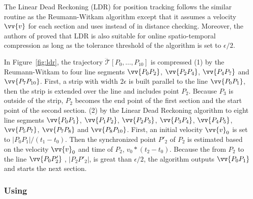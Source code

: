 {{The Linear Dead Reckoning (LDR)\cite{Lange:Tracking} for position tracking follows the similar routine as the Reumann-Witkam algorithm except that it assumes a velocity ${\vv{v}}$ for each section and uses \sed instead of \ped in distance checking.
Moreover, the authors of \cite{Trajcevski:DDR} proved that LDR is also suitable for online spatio-temporal compression as long as the tolerance threshold of the algorithm is set to $\epsilon/2$.}

\begin{example}
\label{exm-alg-strip}
In Figure~\ref{fig:ldr}, the trajectory $\dddot{\mathcal{T}}[P_0, \ldots, P_{10}]$ is compressed
%
(1) by the Reumann-Witkam to four line segments $\vv{P_0P_2}$, $\vv{P_2P_4}$, $\vv{P_4P_7}$ and $\vv{P_7P_{10}}$. First, a strip with width $2\epsilon$ is built parallel to the line $\vv{P_0P_1}$, then the strip is extended over the line and includes point $P_2$. Because $P_3$ is outside of the strip, $P_2$ becomes the end point of the first section and the start point of the second section.
%
(2) by the Linear Dead Reckoning algorithm to eight line segments $\vv{P_0P_1}$, $\vv{P_1P_2}$, $\vv{P_2P_3}$, $\vv{P_3P_4}$, $\vv{P_4P_5}$, $\vv{P_5P_7}$, $\vv{P_7P_8}$ and $\vv{P_8P_{10}}$. First, an initial velocity ${\vv{v}_0}$ is set to $|P_0P_1|/(t_1-t_0)$. Then the synchronized point $P'_2$ of $P_2$ is estimated based on the velocity ${\vv{v}_0}$ and time of $P_2$, \ie ${v}_0 * (t_2-t_0)$. Because the \sed from $P_2$ to the line $\vv{P_0P'_2}$ , \ie $|P_2P'_2|$, is great than $\epsilon/2$, the algorithm outputs $\vv{P_0P_1}$ and starts the next section.
\end{example}

}%

\subsubsection{\operb Using \ped}
\label{sec-operb}


